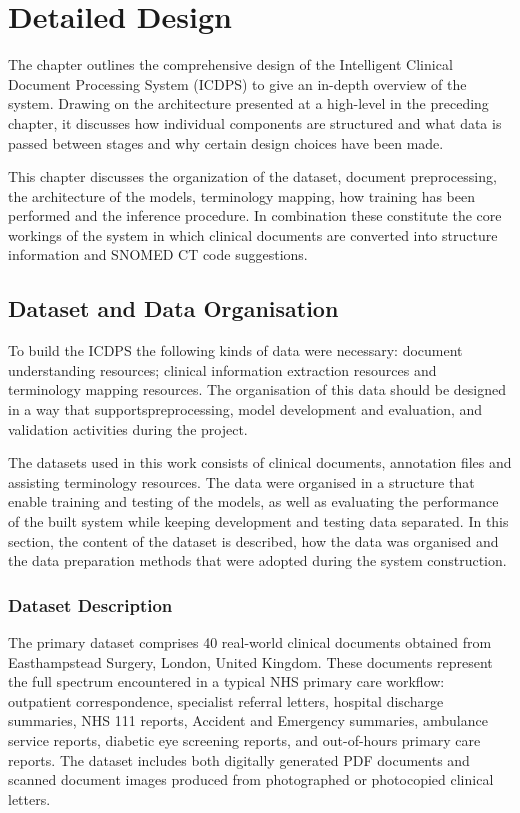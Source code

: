 \chapter{Detailed Design}

The chapter outlines the comprehensive design of the Intelligent Clinical Document Processing System (ICDPS) to give an in-depth overview of the system. Drawing on the architecture presented at a high-level in the preceding chapter, it discusses how individual components are structured and what data is passed between stages and why certain design choices have been made.

This chapter discusses the organization of the dataset, document preprocessing, the architecture of the models, terminology mapping, how training has been performed and the inference procedure. In combination these constitute the core workings of the system in which clinical documents are converted into structure information and SNOMED CT code suggestions.

\section{Dataset and Data Organisation}

To build the ICDPS the following kinds of data were necessary: document understanding resources; clinical information extraction resources and terminology mapping resources. The organisation of this data should be designed in a way that supportspreprocessing, model development and evaluation, and validation activities during the project.

The datasets used in this work consists of clinical documents, annotation files and assisting terminology resources. The data were organised in a structure that enable training and testing of the models, as well as evaluating the performance of the built system while keeping development and testing data separated. In this section, the content of the dataset is described, how the data was organised and the data preparation methods that were adopted during the system construction.

\subsection{Dataset Description}
The primary dataset comprises 40 real-world clinical documents obtained from Easthampstead Surgery, London, United Kingdom. These documents represent the full spectrum encountered in a typical NHS primary care workflow: outpatient correspondence, specialist referral letters, hospital discharge summaries, NHS 111 reports, Accident and Emergency summaries, ambulance service reports, diabetic eye screening reports, and out-of-hours primary care reports. The dataset includes both digitally generated PDF documents and scanned document images produced from photographed or photocopied clinical letters.

